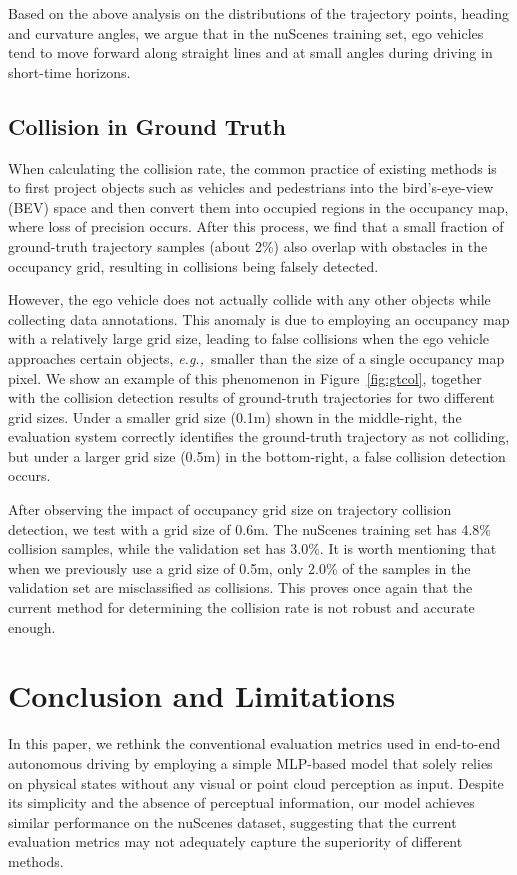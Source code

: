 \documentclass[10pt,twocolumn,letterpaper]{article}
\def\eg{\emph{e.g.,~}}
\begin{document}
Based on the above analysis on the distributions of the trajectory points,
heading and curvature angles, we argue that in the nuScenes training set, 
ego vehicles tend to move forward along straight lines and 
at small angles during driving in short-time horizons.


\subsection{Collision in Ground Truth}
When calculating the collision rate, 
the common practice of existing methods is to
first project objects such as vehicles and pedestrians into the bird's-eye-view (BEV) space 
and then convert them into occupied regions in the occupancy map,
where loss of precision occurs.
After this process, we find that a small fraction of ground-truth 
trajectory samples (about 2\%) also overlap with obstacles in the occupancy grid, 
resulting in collisions being falsely detected. 


However, the ego vehicle does not actually collide with any other objects while collecting data annotations. 
This anomaly is due to employing an occupancy map with a relatively large grid size, 
leading to false collisions when the ego vehicle approaches certain objects, 
\eg smaller than the size of a single occupancy map pixel.
We show an example of this phenomenon in Figure~\ref{fig:gtcol}, 
together with the collision detection results of ground-truth trajectories 
for two different grid sizes. 
Under a smaller grid size (0.1m) shown in the middle-right,
the evaluation system correctly identifies the ground-truth trajectory as not colliding, 
but under a larger grid size (0.5m) in the bottom-right, a false collision detection occurs.

After observing the impact of occupancy grid size on trajectory collision detection, 
we test with a grid size of 0.6m. 
The nuScenes training set has 4.8\% collision samples, while the validation set has 3.0\%. 
It is worth mentioning that when we previously use a grid size of 0.5m, 
only 2.0\% of the samples in the validation set are misclassified as collisions. 
This proves once again that the current method for determining the collision rate 
is not robust and accurate enough.


\section{Conclusion and Limitations} 
In this paper, we rethink the conventional evaluation metrics used in end-to-end autonomous driving by employing a simple MLP-based model that solely relies on physical states without any visual or point cloud perception as input. 
Despite its simplicity and the absence of perceptual information, our model achieves similar performance on the nuScenes dataset, suggesting that the current evaluation metrics may not adequately capture the superiority of different methods.
\end{document}
